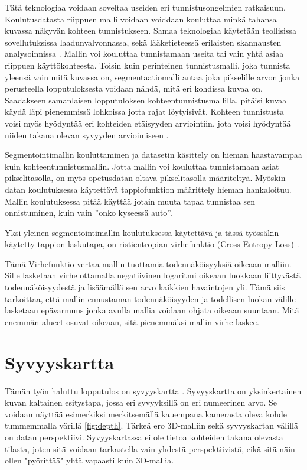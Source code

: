 Tätä teknologiaa voidaan soveltaa useiden eri tunnistusongelmien ratkaisuun.
Koulutusdatasta riippuen malli voidaan voiddaan kouluttaa minkä tahansa kuvassa näkyvän kohteen tunnistukseen.
Samaa teknologiaa käytetään teollisissa sovellutuksissa laadunvalvonnassa,
sekä lääketieteessä erilaisten skannausten analysoinnissa \cite{NagalakshmiT2022BCSS}.
Mallin voi kouluttaa tunnistamaan useita tai vain yhtä asiaa riippuen käyttökohteesta.
Toisin kuin perinteinen tunnistusmalli, joka tunnista yleensä vain mitä kuvassa on,
segmentaatiomalli antaa joka pikselille arvon jonka perusteella lopputuloksesta voidaan nähdä, mitä eri kohdissa kuvaa on.
Saadakseen samanlaisen lopputuloksen kohteentunnistusmallilla, pitäisi kuvaa käydä läpi pienemmissä lohkoissa jotta rajat löytyisivät.
Kohteen tunnistusta voisi myös hyödyntää eri kohteiden etäisyyden arviointiin, jota voisi hyödyntää niiden takana olevan syvyyden arvioimiseen \cite{ShiZhou2023VRBo}.

Segmentointimallin kouluttaminen ja datasetin käsittely on hieman haastavampaa kuin kohteentunnistusmallin.
Jotta mallin voi kouluttaa tunnistamaan asiat pikselitasolla, on myös opetusdatan oltava pikselitasolla määriteltyä. 
Myöskin datan koulutuksessa käytettävä tappiofunktion määrittely hieman hankaloituu.
Mallin koulutuksessa pitää käyttää jotain muuta tapaa tunnistaa sen onnistuminen, kuin vain ”onko kyseessä auto”.

Yksi yleinen segmentointimallin koulutuksessa käytettävä ja tässä työssäkin käytetty tappion laskutapa, 
on ristientropian virhefunktio (Cross Entropy Loss) \cite{CrossEntropyLoss}. 

Tämä Virhefunktio vertaa mallin tuottamia todennäköisyyksiä oikeaan malliin. 
Sille lasketaan virhe ottamalla negatiivinen logaritmi oikeaan luokkaan liittyvästä todennäköisyydestä ja lisäämällä sen arvo kaikkien havaintojen yli.
Tämä siis tarkoittaa, että mallin ennustaman todennäköisyyden ja todellisen luokan välille lasketaan epävarmuus jonka avulla mallia voidaan ohjata oikeaan suuntaan.
Mitä enemmän alueet osuvat oikeaan, sitä pienemmäksi mallin virhe laskee.

\section{Syvyyskartta}

Tämän työn haluttu lopputulos on syvyyskartta \cite{IkeuchiKatsushi1987DaDM}.  
Syvyyskartta on yksinkertainen kuvan kaltainen esitystapa, jossa eri syvyyksillä on eri numeerinen arvo.  
Se voidaan näyttää esimerkiksi merkitsemällä kauempana kamerasta oleva kohde tummemmalla värillä \ref{fig:depth}.  
Tärkeä ero 3D-malliin sekä syvyyskartan välillä on datan perspektiivi.  
Syvyyskartassa ei ole tietoa kohteiden takana olevasta tilasta, joten sitä voidaan tarkastella vain yhdestä perspektiivistä, eikä sitä näin ollen "pyörittää" yhtä vapaasti kuin 3D-mallia.  

